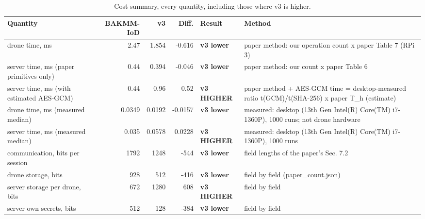 \begin{table}[!t]
\centering
\footnotesize
\caption{Cost summary, every quantity, including those where v3 is higher.}
\label{tab:final-cost}
\setlength{\tabcolsep}{3pt}
\begin{tabular}{p{3.6cm}rrrp{1.6cm}p{5.6cm}}
\toprule
Quantity & BAKMM-IoD & v3 & Diff. & Result & Method \\
\midrule
drone time, ms & 2.47 & 1.854 & -0.616 & \textbf{v3 lower} & paper method: our operation count x paper Table 7 (RPi 3) \\
server time, ms (paper primitives only) & 0.44 & 0.394 & -0.046 & \textbf{v3 lower} & paper method: our count x paper Table 6 \\
server time, ms (with estimated AES-GCM) & 0.44 & 0.96 & 0.52 & \textbf{v3 HIGHER} & paper method + AES-GCM time = desktop-measured ratio t(GCM)/t(SHA-256) x paper T\_h (estimate) \\
drone time, ms (measured median) & 0.0349 & 0.0192 & -0.0157 & \textbf{v3 lower} & measured: desktop (13th Gen Intel(R) Core(TM) i7-1360P), 1000 runs; not drone hardware \\
server time, ms (measured median) & 0.035 & 0.0578 & 0.0228 & \textbf{v3 HIGHER} & measured: desktop (13th Gen Intel(R) Core(TM) i7-1360P), 1000 runs \\
communication, bits per session & 1792 & 1248 & -544 & \textbf{v3 lower} & field lengths of the paper's Sec. 7.2 \\
drone storage, bits & 928 & 512 & -416 & \textbf{v3 lower} & field by field (paper\_count.json) \\
server storage per drone, bits & 672 & 1280 & 608 & \textbf{v3 HIGHER} & field by field \\
server own secrets, bits & 512 & 128 & -384 & \textbf{v3 lower} & field by field \\
\bottomrule
\end{tabular}
\end{table}
